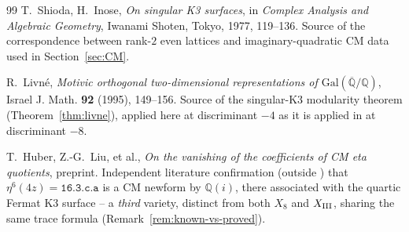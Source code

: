 \documentclass[11pt]{amsart}
\theoremstyle{definition}
\newcommand{\Q}{\mathbb{Q}}
\begin{document}
\begin{thebibliography}{99}
T.~Shioda, H.~Inose, \emph{On singular K3 surfaces}, in \emph{Complex
Analysis and Algebraic Geometry}, Iwanami Shoten, Tokyo, 1977, 119--136.
Source of the correspondence between rank-$2$ even lattices and
imaginary-quadratic CM data used in Section~\ref{sec:CM}.

R.~Livn\'e, \emph{Motivic orthogonal two-dimensional representations of
$\mathrm{Gal}(\overline{\mathbb Q}/\mathbb Q)$}, Israel J. Math.
\textbf{92} (1995), 149--156. Source of the singular-K3 modularity
theorem (Theorem~\ref{thm:livne}), applied here at discriminant $-4$ as
it is applied in \cite{ClassesI_II} at discriminant $-8$.

T.~Huber, Z.-G.~Liu, et al., \emph{On the vanishing of the coefficients
of CM eta quotients}, preprint. Independent literature confirmation
(outside \cite{AOP2002}) that $\eta^6(4z)=\texttt{16.3.c.a}$ is a CM
newform by $\Q(i)$, there associated with the quartic Fermat K3 surface
-- a \emph{third} variety, distinct from both $X_8$ and $X_{\rm III}$,
sharing the same trace formula (Remark~\ref{rem:known-vs-proved}).

\end{thebibliography}
\end{document}
